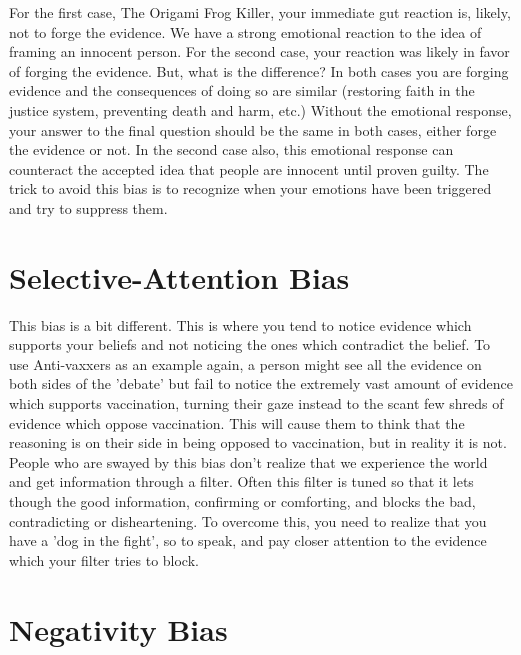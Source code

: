 For the first case, The Origami Frog Killer, your immediate gut reaction is, likely, not to forge the evidence. We have a strong emotional reaction to the idea of framing an innocent person. For the second case, your reaction was likely in favor of forging the evidence. But, what is the difference? In both cases you are forging evidence and the consequences of doing so are similar (restoring faith in the justice system, preventing death and harm, etc.) Without the emotional response, your answer to the final question should be the same in both cases, either forge the evidence or not. In the second case also, this emotional response can counteract the accepted idea that people are innocent until proven guilty. The trick to avoid this bias is to recognize when your emotions have been triggered and try to suppress them.

\section{Selective-Attention Bias}

This bias is a bit different. This is where you tend to notice evidence which supports your beliefs and not noticing the ones which contradict the belief. To use Anti-vaxxers as an example again, a person might see all the evidence on both sides of the 'debate' but fail to notice the extremely vast amount of evidence which supports vaccination, turning their gaze instead to the scant few shreds of evidence which oppose vaccination. This will cause them to think that the reasoning is on their side in being opposed to vaccination, but in reality it is not. People who are swayed by this bias don't realize that we experience the world and get information through a filter. Often this filter is tuned so that it lets though the good information, confirming or comforting, and blocks the bad, contradicting or disheartening. To overcome this, you need to realize that you have a 'dog in the fight', so to speak, and pay closer attention to the evidence which your filter tries to block.

\section{Negativity Bias}

